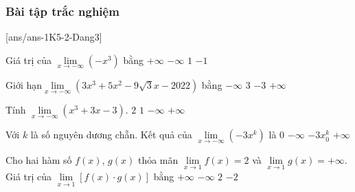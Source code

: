 \subsubsection{Bài tập trắc nghiệm}
[ans/ans-1K5-2-Dang3]
\begin{ex}%
	Giá trị của $\lim\limits_{x\to -\infty}(-x^3)$ bằng
	\choice
	{\True $+\infty$}
	{$-\infty$}
	{$1$}
	{$-1$}
\end{ex}
\begin{ex}%
	Giới hạn$\lim\limits_{x\to -\infty} \left(3x^3+5x^2-9\sqrt {3}x-2022 \right)$ bằng
	\choice
	{\True $-\infty $}
	{$3$}
	{$-3$}
	{$+\infty $}
\end{ex}
\begin{ex}%
	Tính $\lim\limits_{x\to -\infty } ( x^3+3x-3 )$.
	\choice
	{$2$}
	{$1$}
	{\True $-\infty $}
	{$+\infty $}
\end{ex}
\begin{ex}%
	Với $ k$ là số nguyên dương chẵn. Kết quả của $\lim\limits_{x\to -\infty } \left(-3x^k \right)$ là
	\choice
	{$0$}
	{\True $-\infty $}
	{$-3x_0^k$}
	{$+\infty $}
\end{ex}
\begin{ex}%
	Cho hai hàm số $ f(x)$, $g(x)$ thỏa mãn $\lim\limits_{x\to 1} f(x)=2$ và $\lim\limits_{x\to 1} g(x)=+\infty $. Giá trị của $\lim\limits_{x\to 1} [ f(x)\cdot g(x)]$ bằng
	\choice
	{\True $+\infty $}
	{$-\infty $}
	{$2$}
	{$-2$}
\end{ex}
